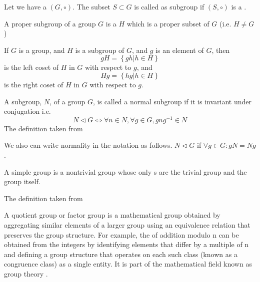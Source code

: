 \begin{appendices}
\begin{definition}[Subgroup]
  Let we have a  $\left(G, \circ\right)$. The
  subset $S \subset G$ is called as subgroup if $\left(S,
  \circ\right)$ is a .
  \label{def:subgroup}
\end{definition}

\begin{definition}
  A proper subgroup of a group $G$ is a  $H$
  which is a proper subset of $G$ (i.e. $H \ne G$) \cite{wiki:group}
  \label{def:propersubgroup}
\end{definition}

\begin{definition}[Coset]
  If $G$ is a group, and $H$ is a subgroup of $G$, and $g$ is an
  element of $G$, then
  \[
  gH = \left\{ gh \vert h \in H\right\}
  \]
  is the left coset of $H$ in $G$ with respect to $g$, and
  \[
  Hg = \left\{ hg \vert h \in H\right\}
  \]
  is the right coset of $H$ in $G$ with respect to $g$.
  \label{def:coset}
\end{definition}

\begin{definition}
  A subgroup, $N$, of a group $G$, is called a normal subgroup if it
  is invariant under conjugation i.e. 
  \[
  N \triangleleft G \Leftrightarrow
  \forall n \in N, \forall g \in G, g n g^{-1} \in N
  \]  
  The definition taken from \cite{wiki:normalsubgroup}

  We also can write normality in the  notation as
  follows.
  $N \triangleleft G$ if $\forall g \in G: gN = Ng$.
  \label{def:normalsubgroup}
\end{definition}

\begin{definition}
   A simple group is a nontrivial group whose only
   s are the trivial group and the group
   itself.

   The definition taken from \cite{wiki:simplegroup}
   \label{def:simplegroup}
\end{definition}

\begin{definition}
  A quotient group or factor group is a mathematical group obtained by
  aggregating similar elements of a larger group using an equivalence
  relation that preserves the group structure. For example, the
   of addition modulo n can be obtained from
  the integers by 
  identifying elements that differ by a multiple of n and defining a
  group structure that operates on each such class (known as a
  congruence class) as a single entity. It is part of the mathematical
  field known as group theory \cite{wiki:quotientgroup}. 


\end{definition}
\end{appendices}
